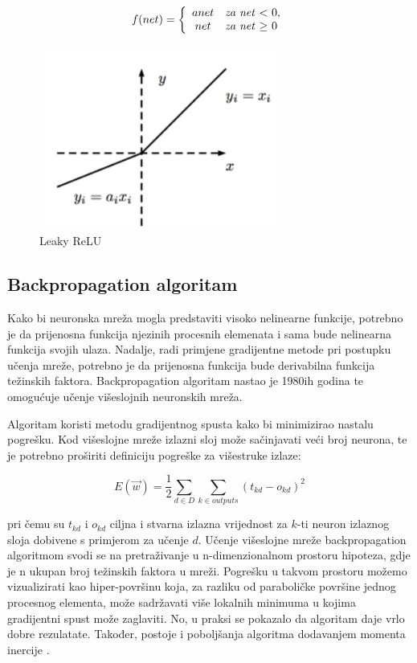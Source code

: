 \begin{equation}
f(net)=\left\{
\begin{array}{c l}	
     a {net}   & $\textit{za net} $ < $ $ 0,\\
     {net}     & $\textit{za net} $ \geq $ $ 0
\end{array}\right.
\label{eq:Leaky ReLU}
\end{equation}

\begin{figure}[H]
\centering
\includegraphics[width=8cm]{img/LeakyReLU.png}
\caption{Leaky ReLU}
\label{img:Leaky ReLU}
\end{figure}

\subsection{Backpropagation algoritam}

Kako bi neuronska mreža mogla predstaviti visoko nelinearne
funkcije, potrebno je da prijenosna funkcija njezinih procesnih elemenata i sama bude
nelinearna funkcija svojih ulaza. Nadalje, radi primjene gradijentne metode pri postupku
učenja mreže, potrebno je da prijenosna funkcija bude derivabilna funkcija težinskih
faktora. Backpropagation algoritam \citep{Backpropagation} nastao je 1980ih godina te omogućuje učenje višeslojnih neuronskih mreža.

Algoritam koristi metodu gradijentnog spusta kako bi minimizirao nastalu pogrešku.
Kod višeslojne mreže izlazni sloj može sačinjavati veći broj neurona, te je potrebno
proširiti definiciju pogreške za višestruke izlaze:

\begin{equation}
E(\vec{w}) = \frac{1}{2} \sum_{d \in D}^{} \sum_{k \in outputs}^{} (t_{kd} - o_{kd})^2
\label{eq:loss-function}
\end{equation}

pri čemu su $t_{kd}$ i $o_{kd}$ ciljna i stvarna izlazna vrijednost za $k$-ti neuron izlaznog sloja dobivene s primjerom za učenje $d$. Učenje višeslojne mreže backpropagation algoritmom svodi se na pretraživanje u n-dimenzionalnom prostoru hipoteza, gdje je n ukupan broj težinskih faktora u mreži. Pogrešku u takvom prostoru možemo vizualizirati kao hiper-površinu koja, za razliku od paraboličke površine jednog procesnog elementa, može sadržavati više lokalnih minimuma u kojima gradijentni spust može zaglaviti. No, u praksi se pokazalo da algoritam daje vrlo dobre rezulatate. Također, postoje i poboljšanja algoritma dodavanjem momenta inercije \citep{NesterovMomentum}.\\

